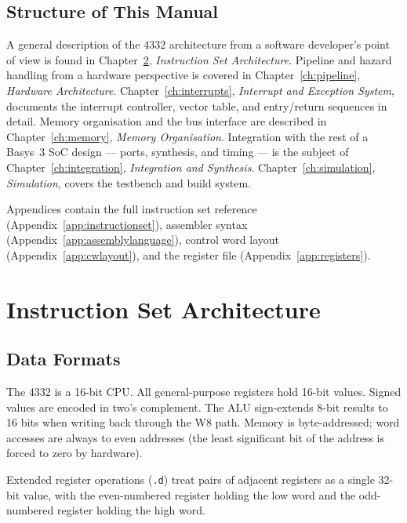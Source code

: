 \documentclass[a4paper,12pt]{report}
\newcommand{\asm}[1]{\texttt{#1}}
\begin{document}
\section{Structure of This Manual}

A general description of the 4332 architecture from a software developer's point of view is found in Chapter~\ref{ch:isa}, \emph{Instruction Set Architecture}. Pipeline and hazard handling from a hardware perspective is covered in Chapter~\ref{ch:pipeline}, \emph{Hardware Architecture}. Chapter~\ref{ch:interrupts}, \emph{Interrupt and Exception System}, documents the interrupt controller, vector table, and entry/return sequences in detail. Memory organisation and the bus interface are described in Chapter~\ref{ch:memory}, \emph{Memory Organisation}. Integration with the rest of a Basys~3 SoC design --- ports, synthesis, and timing --- is the subject of Chapter~\ref{ch:integration}, \emph{Integration and Synthesis}. Chapter~\ref{ch:simulation}, \emph{Simulation}, covers the testbench and build system.

Appendices contain the full instruction set reference (Appendix~\ref{app:instructionset}), assembler syntax (Appendix~\ref{app:assemblylanguage}), control word layout (Appendix~\ref{app:cwlayout}), and the register file (Appendix~\ref{app:registers}).

\chapter{Instruction Set Architecture}
\label{ch:isa}

\section{Data Formats}

The 4332 is a 16-bit CPU. All general-purpose registers hold 16-bit values. Signed values are encoded in two's complement. The ALU sign-extends 8-bit results to 16 bits when writing back through the W8 path. Memory is byte-addressed; word accesses are always to even addresses (the least significant bit of the address is forced to zero by hardware).

Extended register operations (\asm{.d}) treat pairs of adjacent registers as a single 32-bit value, with the even-numbered register holding the low word and the odd-numbered register holding the high word.
\end{document}
